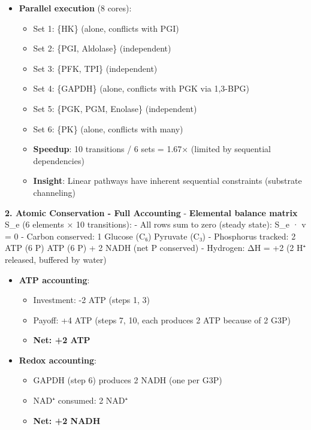 \begin{itemize}
\tightlist
\item
  \textbf{Parallel execution} (8 cores):

  \begin{itemize}
  \tightlist
  \item
    Set 1: \{HK\} (alone, conflicts with PGI)
  \item
    Set 2: \{PGI, Aldolase\} (independent)
  \item
    Set 3: \{PFK, TPI\} (independent)
  \item
    Set 4: \{GAPDH\} (alone, conflicts with PGK via 1,3-BPG)
  \item
    Set 5: \{PGK, PGM, Enolase\} (independent)
  \item
    Set 6: \{PK\} (alone, conflicts with many)
  \item
    \textbf{Speedup}: 10 transitions / 6 sets = 1.67× (limited by
    sequential dependencies)
  \item
    \textbf{Insight}: Linear pathways have inherent sequential
    constraints (substrate channeling)
  \end{itemize}
\end{itemize}

\textbf{2. Atomic Conservation - Full Accounting} \checkmark - \textbf{Elemental
balance matrix} S\_e (6 elements × 10 transitions): - All rows sum to
zero (steady state): S\_e · v = 0 - Carbon conserved: 1 Glucose (C₆) 
Pyruvate (C₃) \checkmark - Phosphorus tracked: 2 ATP (6 P)  ATP (6 P) + 2 NADH
\checkmark (net P conserved) - Hydrogen: ΔH = +2 (2 H⁺ released, buffered by
water)

\begin{itemize}
\tightlist
\item
  \textbf{ATP accounting}:

  \begin{itemize}
  \tightlist
  \item
    Investment: -2 ATP (steps 1, 3)
  \item
    Payoff: +4 ATP (steps 7, 10, each produces 2 ATP because of 2 G3P)
  \item
    \textbf{Net: +2 ATP} \checkmark
  \end{itemize}
\item
  \textbf{Redox accounting}:

  \begin{itemize}
  \tightlist
  \item
    GAPDH (step 6) produces 2 NADH (one per G3P)
  \item
    NAD⁺ consumed: 2 NAD⁺
  \item
    \textbf{Net: +2 NADH} \checkmark
  \end{itemize}
\end{itemize}

